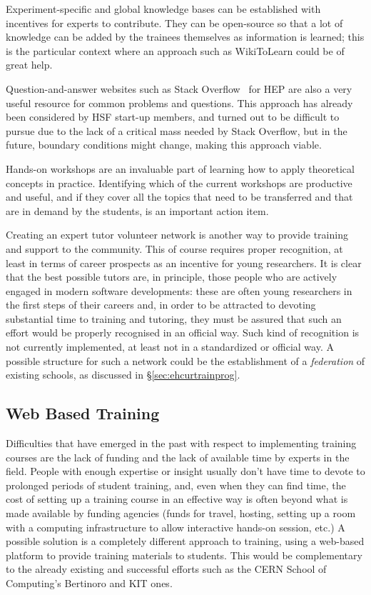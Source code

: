 \documentclass[12pt,a4paper]{article}
\begin{document}
Experiment-specific and global knowledge bases can be established with
incentives for experts to contribute. They can be open-source so that a lot of
knowledge can be added by the trainees themselves as information is learned;
this is the particular context where an approach such as WikiToLearn could be
of great help.

Question-and-answer websites such as Stack Overflow~\cite{Stackoverflow} for HEP are also a very
useful resource for common problems and questions. This approach has already
been considered by HSF start-up members, and turned out to be difficult to
pursue due to the lack of a critical mass needed by Stack Overflow, but in the
future, boundary conditions might change, making this approach viable.

Hands-on workshops are an invaluable part of learning how to apply theoretical
concepts in practice. Identifying which of the current workshops are productive
and useful, and if they cover all the topics that need to be transferred and
that are in demand by the students, is an important action item.

Creating an expert tutor volunteer network is another way to provide training
and support to the community.
This of course requires proper recognition, at least in terms of career
prospects as an incentive for young researchers. It is clear that the best
possible tutors are, in principle, those people who are actively engaged in
modern software developments: these are often young researchers in the
first steps of their careers and, in order to be attracted to devoting
substantial time to training and tutoring, they must be assured that such an
effort would be properly recognised in an official way. Such kind of recognition
is not currently implemented, at least not in a standardized or official way. A
possible structure for such a network could be the establishment of a
{\em federation} of existing schools, as discussed in \S\ref{sec:ehcurtrainprog}.

\subsection{Web Based Training}

Difficulties that have emerged in the past with respect to implementing training
courses are the lack of funding and the lack of available time by experts in the
field. People with enough expertise or insight usually don't have time to devote
to prolonged periods of student training, and, even when they can find time, the
cost of setting up a training course in an effective way is often beyond what is
made available by funding agencies (funds for travel, hosting, setting up a room
with a computing infrastructure to allow interactive hands-on session, etc.) A
possible solution is a completely different approach to training, using a
web-based platform to provide training materials to students. This would be
complementary to the already existing and successful efforts such as the CERN
School of Computing's Bertinoro and KIT ones.
\end{document}
